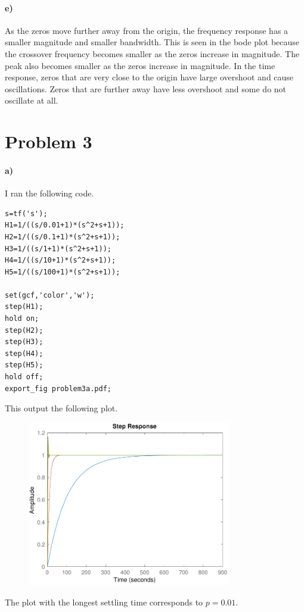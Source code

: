 \documentclass[12pt]{article}
\begin{document}
\paragraph{e)}

As the zeros move further away from the origin, the frequency response has a smaller magnitude and smaller bandwidth.
This is seen in the bode plot because the crossover frequency becomes smaller as the zeros increase in magnitude.
The peak also becomes smaller as the zeros increase in magnitude. In the time response, zeros that are very close
to the origin have large overshoot and cause oscillations. Zeros that are further away have less overshoot and
some do not oscillate at all.

\section*{Problem 3}

\paragraph{a)}

I ran the following code.
\begin{verbatim}
s=tf('s');
H1=1/((s/0.01+1)*(s^2+s+1));
H2=1/((s/0.1+1)*(s^2+s+1));
H3=1/((s/1+1)*(s^2+s+1));
H4=1/((s/10+1)*(s^2+s+1));
H5=1/((s/100+1)*(s^2+s+1));

set(gcf,'color','w');
step(H1);
hold on;
step(H2);
step(H3);
step(H4);
step(H5);
hold off;
export_fig problem3a.pdf;
\end{verbatim}
This output the following plot.
\begin{figure}[H]
    \begin{center}
        \includegraphics[width=3.5in]{problem3a.pdf}
    \end{center}
\end{figure}
The plot with the longest settling time corresponds to \(p=0.01\).
\end{document}
